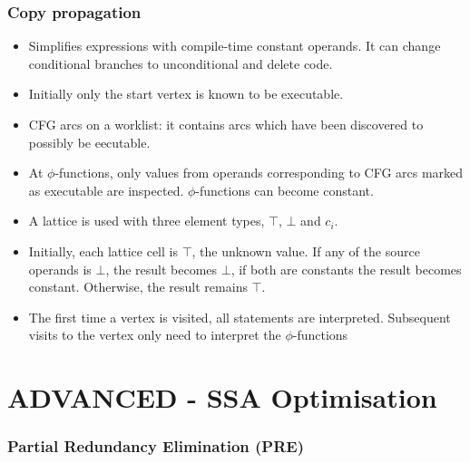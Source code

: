 \documentclass[a4paper,12pt, notitlepage]{article}
\begin{document}
\subsubsection*{Copy propagation}
\begin{itemize}
\item Simplifies expressions with compile-time constant operands. It can change
conditional branches to unconditional and delete code.
\item Initially only the start vertex is known to be executable.
\item CFG arcs on a worklist: it contains arcs which have been discovered to
possibly be eecutable.
\item At $\phi$-functions, only values from operands corresponding to CFG arcs
marked as executable are inspected. $\phi$-functions can become constant.
\item A lattice is used with three element types, $\top$, $\bot$ and $c_i$.
\item Initially, each lattice cell is $\top$, the unknown value.
If any of the source operands is $\bot$, the result becomes $\bot$, if both are
constants the result becomes constant. Otherwise, the result remains $\top$.
\item The first time a vertex is visited, all statements are interpreted.
Subsequent visits to the vertex only need to interpret the $\phi$-functions
\end{itemize}

\pagebreak
\section*{ADVANCED - SSA Optimisation}
\subsubsection*{Partial Redundancy Elimination (PRE)}
\end{document}
